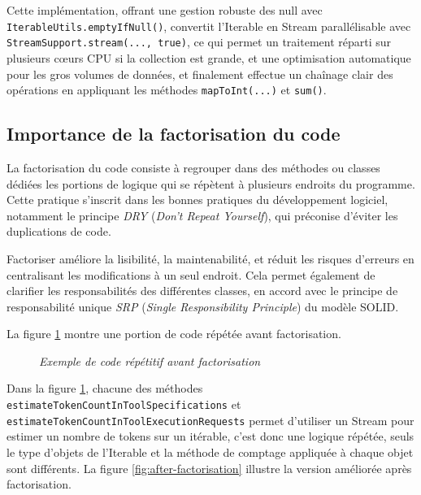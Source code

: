 \documentclass[12pt,a4paper]{report}
\begin{document}
	Cette implémentation, offrant une gestion robuste des null avec \verb|IterableUtils.emptyIfNull()|, convertit l'Iterable en Stream parallélisable avec \verb|StreamSupport.stream(..., true)|, ce qui permet un traitement réparti sur plusieurs cœurs CPU si la collection est grande, et une optimisation automatique pour les gros volumes de données, et finalement effectue un chaînage clair des opérations en appliquant les méthodes \verb|mapToInt(...)| et \verb|sum()|.
	
	\subsection{Importance de la factorisation du code}
	
	La factorisation du code consiste à regrouper dans des méthodes ou classes dédiées les portions de logique qui se répètent à plusieurs endroits du programme. Cette pratique s'inscrit dans les bonnes pratiques du développement logiciel, notamment le principe \textit{DRY} (\textit{Don't Repeat Yourself}), qui préconise d'éviter les duplications de code.
	
	Factoriser améliore la lisibilité, la maintenabilité, et réduit les risques d'erreurs en centralisant les modifications à un seul endroit. Cela permet également de clarifier les responsabilités des différentes classes, en accord avec le principe de responsabilité unique \textit{SRP} (\textit{Single Responsibility Principle}) du modèle SOLID.
	
	La figure \ref{fig:before-factorisation} montre une portion de code répétée avant factorisation.
	
	\begin{figure}[H]
		\centering
		\caption{\textit{Exemple de code répétitif avant factorisation}}
		\label{fig:before-factorisation}
	\end{figure}
	
	Dans la figure \ref{fig:before-factorisation}, chacune des méthodes \verb|estimateTokenCountInToolSpecifications| et \verb|estimateTokenCountInToolExecutionRequests| permet d'utiliser un Stream pour estimer un nombre de tokens sur un itérable, c'est donc une logique répétée, seuls le type d'objets de l'Iterable et la méthode de comptage appliquée à chaque objet sont différents. La figure \ref{fig:after-factorisation} illustre la version améliorée après factorisation.
	
\end{document}
